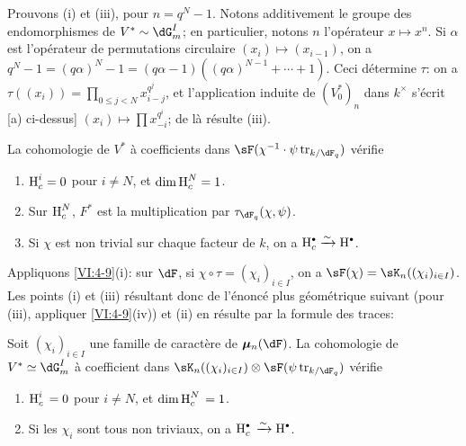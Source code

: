 Prouvons (i) et (iii), pour $n=q^N-1$. Notons additivement le groupe des 
endomorphismes de $V^\ast\sim \dG_m^I$; en particulier, notons $n$ 
l'op\'erateur $x\mapsto x^n$. Si $\alpha$ est l'op\'erateur de permutations 
circulaire $(x_i)\mapsto (x_{i-1})$, on a 
$q^N-1=(q\alpha)^N-1 = (q\alpha-1)((q\alpha)^{N-1}+\cdots + 1)$. Ceci 
d\'etermine $\tau$: on a $\tau((x_i)) = \prod_{0\leqslant j<N} x_{i-j}^{q^j}$, 
et l'application induite de $(V_0^\ast)_n$ dans $k^\times$ s'\'ecrit [a) 
ci-dessus] $(x_i)\mapsto \prod x_{-i}^{q^i}$; de l\`a r\'esulte (iii). 





\begin{proposition_}\label{VI:4-10}
La cohomologie de $V^\ast$ \`a coefficients dans 
$\sF(\chi^{-1}\cdot \psi\tr_{k/\dF_q})$ v\'erifie 
\begin{enumerate}[\indent (i)]
  \item $\operatorname{H}_c^i = 0$ pour $i\ne N$, et $\dim \operatorname{H}_c^N=1$. 
  \item Sur $\operatorname{H}_c^N$, $F^\ast$ est la multiplication par 
    $\tau_{\dF_q}(\chi,\psi)$. 
  \item Si $\chi$ est non trivial sur chaque facteur de $k$, on a 
    $\h_c^\bullet \iso \h^\bullet$. 
\end{enumerate}
\end{proposition_}

Appliquons \ref{VI:4-9}(i): sur $\dF$, si $\chi\circ \tau=(\chi_i)_{i\in I}$, 
on a $\sF(\chi) = \sK_n((\chi_i)_{i\in I})$. Les points (i) et (iii) 
r\'esultant donc de l'\'enonc\'e plus g\'eom\'etrique suivant (pour (iii), 
appliquer \ref{VI:4-9}(iv)) et (ii) en r\'esulte par la formule des traces: 





\begin{proposition_}\label{VI:4-11}
Soit $(\chi_i)_{i\in I}$ une famille de caract\`ere de $\dmu_n(\dF)$. La 
cohomologie de $V^\ast\simeq \dG_m^I$ \`a coefficient dans 
$\sK_n((\chi_i)_{i\in I})\otimes \sF(\psi\tr_{k/\dF_q})$ v\'erifie 
\begin{enumerate}[\indent (i)]
  \item $\operatorname{H}_c^i{}=0$ pour $i\ne N$, et $\dim \operatorname{H}_c^N{} = 1$. 
  \item Si les $\chi_i$ sont tous non triviaux, on a 
    $\h_c^\bullet{}\iso \h^\bullet$. 
\end{enumerate}
\end{proposition_}

